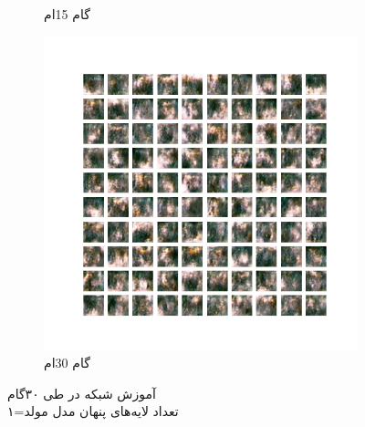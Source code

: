 \documentclass[12pt, a4paper]{book}
\begin{document}
\begin{figure}[h]
\begin{subfigure}{0.3\linewidth}
        \caption{گام 15ام}
    \end{subfigure}
    \begin{subfigure}{0.3\linewidth}
        \includegraphics[width=\linewidth]{images/dcgan/nlayer1/generated_img_30.png}
        \caption{گام 30ام}
    \end{subfigure}
    \caption{آموزش شبکه  در طی ۳۰گام\\ تعداد لایه‌های پنهان مدل مولد=۱}
    \label{dcgan_nlayer1}
\end{figure}
\end{document}
